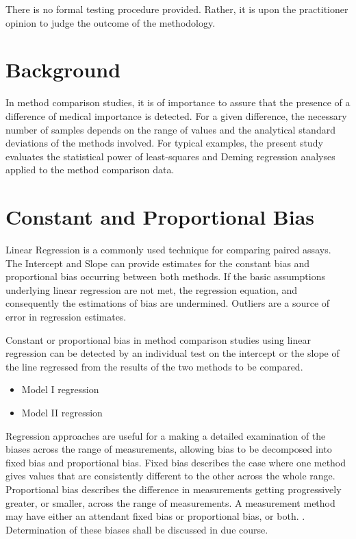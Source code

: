 \documentclass[12pt, a4paper]{report}
\theoremstyle{plain}
\theoremstyle{definition}
\theoremstyle{remark}
\begin{document}
There is no formal testing procedure provided. Rather, it is upon
the practitioner opinion to judge the outcome of the methodology.








\section{Background} 
In method comparison studies, it is of importance to assure that the presence of a difference of medical importance is detected. 
For a given difference, the necessary number of samples depends on the range of values and the analytical standard deviations of the methods involved. For typical examples, the present study evaluates the statistical power of least-squares and Deming regression analyses applied to the method comparison data.

\section{Constant and Proportional Bias}

Linear Regression is a commonly used technique for comparing paired assays. The Intercept and Slope can provide estimates for the constant bias and proportional bias occurring between both methods. If the basic assumptions underlying linear regression are not met, the regression equation, and consequently the estimations
of bias are undermined. Outliers are a source of error in regression estimates.

Constant or proportional bias in method comparison studies using linear regression can be detected by an individual test on the intercept or the slope of the line regressed from the results of the two methods to be compared.

\begin{itemize}
	\item Model I regression
	\item Model II regression
\end{itemize}

Regression approaches are useful for a making a detailed examination of the biases across the range of measurements, allowing bias to be decomposed into fixed bias and proportional bias. Fixed bias describes the case where one method gives values that are consistently different to the other across the whole range. Proportional
bias describes the difference in measurements getting progressively greater, or smaller, across the range of measurements. A measurement method may have either an attendant fixed bias or proportional bias, or both. \citep{ludbrook}. Determination of these biases shall be discussed in due course.
\end{document}
